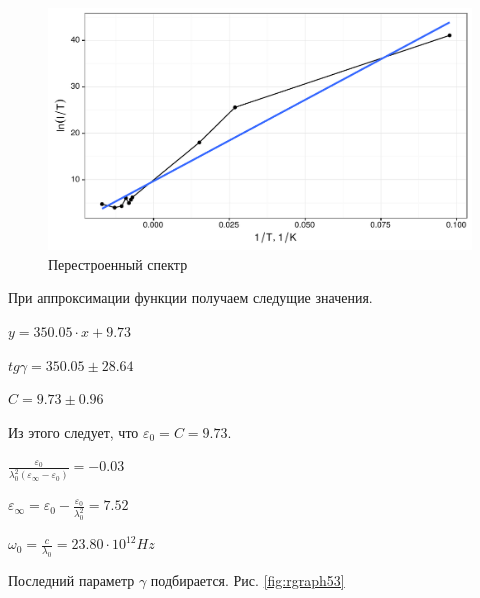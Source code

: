\documentclass[a4paper,11pt]{report}\usepackage[]{graphicx}\usepackage[]{color}
\makeatletter
\def\maxwidth{ %
  \ifdim\Gin@nat@width>\linewidth
    \linewidth
  \else
    \Gin@nat@width
  \fi
}
\newenvironment{kframe}{%
 \def\at@end@of@kframe{}%
 \ifinner\ifhmode%
  \def\at@end@of@kframe{\end{minipage}}%
  \begin{minipage}{\columnwidth}%
 \fi\fi%
 \def\FrameCommand##1{\hskip\@totalleftmargin \hskip-\fboxsep
 \colorbox{shadecolor}{##1}\hskip-\fboxsep
     \hskip-\linewidth \hskip-\@totalleftmargin \hskip\columnwidth}%
 \MakeFramed {\advance\hsize-\width
   \@totalleftmargin\z@ \linewidth\hsize
   \@setminipage}}%
 {\par\unskip\endMakeFramed%
 \at@end@of@kframe}
\newenvironment{knitrout}{}{} %
\makeatother
\begin{document}
\begin{knitrout}
\color{fgcolor}\begin{kframe}


{\ttfamily\noindent\bfseries{}}\end{kframe}\begin{figure}[!h]
\includegraphics[width=\maxwidth]{figure/rgraph52-1} \caption[Перестроенный спектр ]{Перестроенный спектр }\label{fig:rgraph52}
\end{figure}


\end{knitrout}

При аппроксимации функции получаем следущие значения.

$y = 350.05 \cdot x + 9.73 $

$tg \gamma = 350.05 \pm 28.64$

$C = 9.73 \pm 0.96 $

Из этого следует, что $\varepsilon_0 = C = 9.73$.

$ \frac{\varepsilon_0}{\lambda_0^2 (\varepsilon_{\infty} - \varepsilon_0)}= \ensuremath{-0.03}$

$\varepsilon_{\infty} = \varepsilon_0 - \frac{\varepsilon_0}{\lambda_0^2}   =   7.52$

$\omega_0 = \frac{c}{\lambda_0} = 23.80 \cdot 10^{12} Hz$

Последний параметр $\gamma$ подбирается. Рис. \ref{fig:rgraph53}
\end{document}
